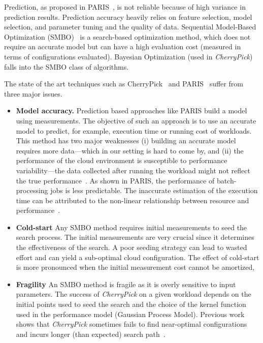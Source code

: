 Prediction, as proposed in PARIS~\cite{Yadwadkar2017},
is not reliable because of high variance in prediction results. 
Prediction accuracy heavily relies on feature selection, model selection,
and parameter tuning and the quality of data.
Sequential Model-Based Optimization (SMBO)~\cite{Dewancker2015}
is a search-based optimization method, which
does not require an accurate model but can have
a high evaluation cost (measured in terms of configurations evaluated).
Bayesian Optimization (used in \emph{CherryPick}) falls into
the SMBO class of algorithms.

The state of the art techniques such as
CherryPick~\cite{Alipourfard2017} and PARIS~\cite{Yadwadkar2017}
suffer from three major issues. 

\begin{itemize}
\item \textbf{Model accuracy.}
Prediction based approaches like PARIS build a model using measurements. The objective of such an approach is to use an accurate model to predict,
for example, execution time or running cost of workloads.
This method has two major weaknesses (i) building an accurate model requires more data---which in our setting is hard to come by, and (ii) the performance of the cloud environment is susceptible to performance variability---the data collected after running the workload might not reflect the true performance~\cite{tang2011impact}.
As shown in PARIS, the performance of batch-processing jobs is less predictable.
The inaccurate estimation of the execution time can be attributed to the non-linear relationship between resource and performance~\cite{Alipourfard2017}. 

\item \textbf{Cold-start}
Any SMBO method requires initial measurements to seed the search process.
The initial measurements are very crucial since
it determines the effectiveness of the search.
A poor seeding strategy can lead to wasted effort and
can yield a sub-optimal cloud configuration.
The effect of cold-start is more pronounced when 
the initial measurement cost cannot be amortized,

\item \textbf{Fragility}
An SMBO method is fragile as it is overly sensitive to input parameters.
The success of \emph{CherryPick} on a given workload depends on the initial points used to seed the search and the choice of the kernel function used in the performance model (Gaussian Process Model).
Previous work shows that \emph{CherryPick}
sometimes fails to find near-optimal configurations and
incurs longer (than expected) search path~\cite{Hsu2018Arrow}.

\end{itemize}


